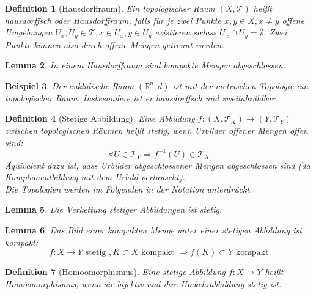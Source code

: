 \documentclass[a4paper]{scrreprt}
\numberwithin{equation}{chapter}
\newcommand{\R}{\mathds{R}}
\theoremstyle{plain}
\newtheorem{defn}{Definition}[section]
\newtheorem{lemma}[defn]{Lemma}
\newtheorem{bsp}[defn]{Beispiel}
\begin{document}
		\begin{defn}[Hausdorffraum]
			Ein topologischer Raum $(X,\mathcal{T})$ heißt hausdorffsch oder Hausdorffraum, falls für je zwei Punkte $x,y\in X, x\neq y$ offene Umgebungen $U_x,U_y\in\mathcal{T}, x\in U_x, y\in U_y$ existieren sodass $U_x\cap U_y=\emptyset$. Zwei Punkte können also durch offene Mengen \glqq getrennt \grqq werden.
		\end{defn}
		\begin{lemma}
			In einem Hausdorffraum sind kompakte Mengen abgeschlossen.
		\end{lemma}
		\begin{bsp}
			Der euklidische Raum $(\R^n,d)$ ist mit der metrischen Topologie ein topologischer Raum. Insbesondere ist er hausdorffsch und zweitabzählbar.
		\end{bsp}
		\begin{defn}[Stetige Abbildung]
			Eine Abbildung $f:(X,\mathcal{T}_X)\rightarrow (Y,\mathcal{T}_Y)$ zwischen topologischen Räumen heißt stetig, wenn Urbilder offener Mengen offen sind:
			\begin{equation*}
				\forall U\in\mathcal{T}_Y \Rightarrow f^{-1}(U)\in\mathcal{T}_X
			\end{equation*}
			Äquivalent dazu ist, dass Urbilder abgeschlossener Mengen abgeschlossen sind (da Komplementbildung mit dem Urbild vertauscht).\\
			Die Topologien werden im Folgenden in der Notation unterdrückt.
		\end{defn}
		\begin{lemma}
			Die Verkettung stetiger Abbildungen ist stetig.
		\end{lemma}
		\begin{lemma}
			Das Bild einer kompakten Menge unter einer stetigen Abbildung ist kompakt:
			\begin{equation*}
				f:X\rightarrow Y \text{ stetig }, K\subset X \text{ kompakt }\Rightarrow f(K)\subset Y \text{ kompakt}
			\end{equation*}
		\end{lemma}
		\begin{defn}[Homöomorphismus]
			Eine stetige Abbildung $f:X\rightarrow Y$ heißt Homöomorphismus, wenn sie bijektiv und ihre Umkehrabbildung stetig ist.
		\end{defn}
\end{document}

